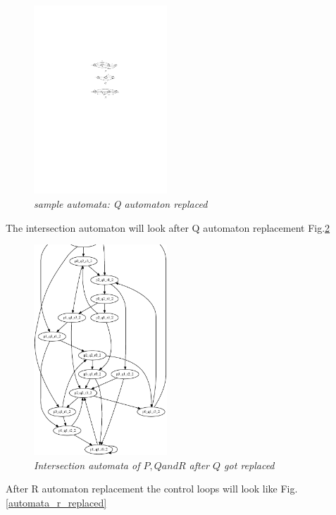 \begin{figure}
\begin{center}
\includegraphics[width=50mm]{graph_after_q_replacement.pdf}
\end{center}
\caption{{\em  sample automata: Q automaton replaced}}
\label{automata_q_replaced}
\end{figure}



The intersection automaton will look after Q automaton replacement Fig.\ref{graph_q_replaced}

 \begin{figure}
\begin{center}
\includegraphics[width=50mm]{graph_q_replaced.eps}
\end{center}
\caption{{\em Intersection automata of $P, Q and R$ after $Q$ got replaced}}
\label{graph_q_replaced}
\end{figure}


After R automaton replacement the control loops will look like Fig. \ref{automata_r_replaced}

